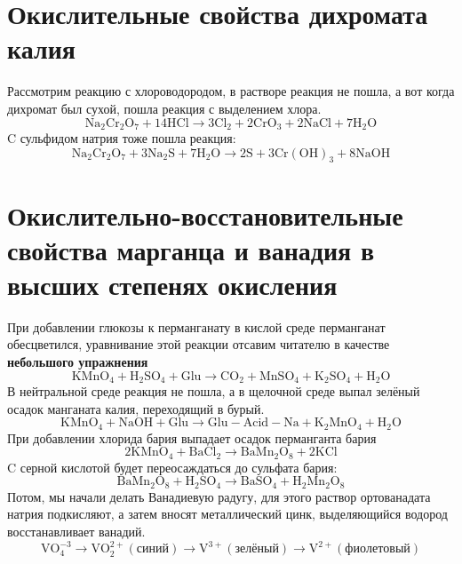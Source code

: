\documentclass[a4paper,12pt]{article}
\begin{document}
\section{Окислительные свойства дихромата калия}
Рассмотрим реакцию с хлороводородом, в растворе реакция не пошла, а вот когда дихромат был сухой, пошла реакция с выделением хлора.
\begin{equation} 
\mathrm{Na_2Cr_2O_7 + 14HCl \longrightarrow 3Cl_2 + 2CrO_3 + 2NaCl + 7H_2O }
\end{equation}
C  сульфидом натрия тоже пошла реакция:
\begin{equation} 
\mathrm{Na_2Cr_2O_7 + 3Na_2S + 7H_2O \longrightarrow 2S + 3Cr(OH)_3 + 8NaOH }
\end{equation}
\section{Окислительно-восстановительные свойства марганца и ванадия в высших
степенях окисления}
При добавлении глюкозы к перманганату в кислой среде перманганат обесцветился, уравнивание этой реакции отсавим читателю в качестве \textbf{небольшого упражнения}
\begin{equation} 
\mathrm{KMnO_4 + H_2SO_4 + Glu \longrightarrow CO_2 + MnSO_4 + K_2SO_4 + H_2O }
\end{equation}
В нейтральной среде реакция не пошла, а в щелочной среде выпал зелёный осадок манганата калия, переходящий в бурый.
\begin{equation} 
\mathrm{KMnO_4 + NaOH + Glu \longrightarrow Glu-Acid-Na + K_2MnO_4 + H_2O }
\end{equation}
При добавлении хлорида бария выпадает осадок перманганта бария
\begin{equation} 
\mathrm{2KMnO_4 + BaCl_2 \longrightarrow BaMn_2O_8 + 2KCl }
\end{equation}
C серной кислотой будет переосаждаться до сульфата бария:
\begin{equation} 
\mathrm{BaMn_2O_8  + H_2SO_4 \longrightarrow BaSO_4 + H_2Mn_2O_8 }
\end{equation}
Потом, мы начали делать Ванадиевую радугу, для этого раствор ортованадата натрия подкисляют, а затем вносят металлический цинк, выделяющийся водород восстанавливает ванадий.
\begin{equation} 
\mathrm{VO_4^{-3} \longrightarrow VO_2^{2+}(синий) \longrightarrow V^{3+}(зелёный)\longrightarrow V^{2+}(фиолетовый)}
\end{equation}
\end{document}
